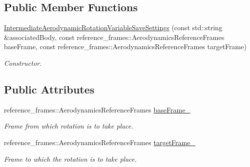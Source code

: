 \subsection*{Public Member Functions}
\begin{DoxyCompactItemize}
\item 
\hyperlink{classtudat_1_1propagators_1_1IntermediateAerodynamicRotationVariableSaveSettings_ad10f82132ef394fab10f4df75bd788c2}{Intermediate\+Aerodynamic\+Rotation\+Variable\+Save\+Settings} (const std\+::string \&associated\+Body, const reference\+\_\+frames\+::\+Aerodynamics\+Reference\+Frames base\+Frame, const reference\+\_\+frames\+::\+Aerodynamics\+Reference\+Frames target\+Frame)
\begin{DoxyCompactList}\small\item\em Constructor. \end{DoxyCompactList}\end{DoxyCompactItemize}
\subsection*{Public Attributes}
\begin{DoxyCompactItemize}
\item 
reference\+\_\+frames\+::\+Aerodynamics\+Reference\+Frames \hyperlink{classtudat_1_1propagators_1_1IntermediateAerodynamicRotationVariableSaveSettings_aaf2d71a72a6a01d30c1d594d0f4524ad}{base\+Frame\+\_\+}\hypertarget{classtudat_1_1propagators_1_1IntermediateAerodynamicRotationVariableSaveSettings_aaf2d71a72a6a01d30c1d594d0f4524ad}{}\label{classtudat_1_1propagators_1_1IntermediateAerodynamicRotationVariableSaveSettings_aaf2d71a72a6a01d30c1d594d0f4524ad}

\begin{DoxyCompactList}\small\item\em Frame from which rotation is to take place. \end{DoxyCompactList}\item 
reference\+\_\+frames\+::\+Aerodynamics\+Reference\+Frames \hyperlink{classtudat_1_1propagators_1_1IntermediateAerodynamicRotationVariableSaveSettings_a15e4f881ccf43a927162c1f479654d07}{target\+Frame\+\_\+}\hypertarget{classtudat_1_1propagators_1_1IntermediateAerodynamicRotationVariableSaveSettings_a15e4f881ccf43a927162c1f479654d07}{}\label{classtudat_1_1propagators_1_1IntermediateAerodynamicRotationVariableSaveSettings_a15e4f881ccf43a927162c1f479654d07}

\begin{DoxyCompactList}\small\item\em Frame to which the rotation is to take place. \end{DoxyCompactList}\end{DoxyCompactItemize}


